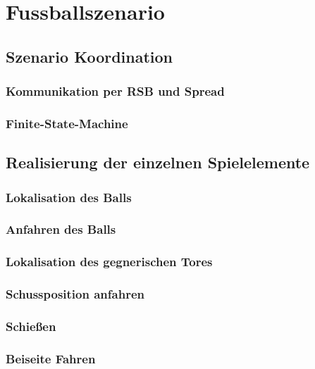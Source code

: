 \chapter{Fussballszenario} \label{kap:Fussballszenario} %

\section{Szenario Koordination} %

\subsection{Kommunikation per RSB und Spread} %

\subsection{Finite-State-Machine} %

\section{Realisierung der einzelnen Spielelemente} %

\subsection{Lokalisation des Balls} %

\subsection{Anfahren des Balls} %

\subsection{Lokalisation des gegnerischen Tores} %

\subsection{Schussposition anfahren} %

\subsection{Schießen} %

\subsection{Beiseite Fahren} %

